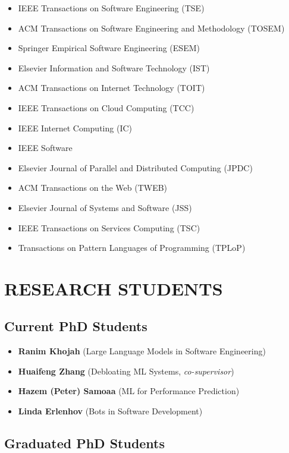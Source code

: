 \documentclass[paper=letter,fontsize=11pt]{scrartcl} %
\newcommand{\NewPart}[2]{\section*{\uppercase{#1} #2}}
\begin{document}
\begin{itemize}
\item IEEE Transactions on Software Engineering (TSE)
\item ACM  Transactions on Software Engineering and Methodology (TOSEM)
\item Springer Empirical Software Engineering (ESEM)
\item Elsevier Information and Software Technology (IST)
\item ACM Transactions on Internet Technology (TOIT)
\item IEEE Transactions on Cloud Computing (TCC)
\item IEEE Internet Computing (IC)
\item IEEE Software
\item Elsevier Journal of Parallel and Distributed Computing (JPDC)
\item ACM Transactions on the Web (TWEB)
\item Elsevier Journal of Systems and Software (JSS)
\item IEEE Transactions on Services Computing (TSC)
\item Transactions on Pattern Languages of Programming (TPLoP)
\end{itemize}

\NewPart{Research Students}{}

\subsection*{Current PhD Students}

\begin{itemize}
\item \textbf{Ranim Khojah} (Large Language Models in Software Engineering)
\item \textbf{Huaifeng Zhang}  (Debloating ML Systems, \emph{co-supervisor})  
\item \textbf{Hazem (Peter) Samoaa}  (ML for Performance Prediction)
\item \textbf{Linda Erlenhov}  (Bots in Software Development)
\end{itemize}

\subsection*{Graduated PhD Students}
\end{document}
